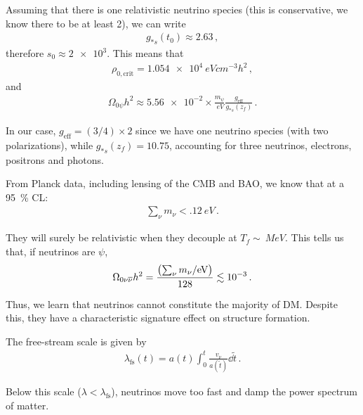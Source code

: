 \documentclass[main.tex]{subfiles}
\begin{document}
Assuming that there is one relativistic neutrino species (this is conservative, we know there to be at least 2), we can write 
%
\begin{align}
g_{*s} (t_0) \approx \num{2.63}
\,,
\end{align}
%
therefore \(s_0  \approx \num{2e3}\). 
This means that 
%
\begin{align}
\rho_{0, \text{crit}} = \SI{1.054e4}{eV cm^{-3}} h^2
\,,
\end{align}
%
and 
%
\begin{align}
\Omega_{0 \psi } h^2 \approx \num{5.56e-2} \times \frac{m_\psi }{\SI{}{eV}} \frac{g _{\text{eff}}}{g_{*s} (z_f)}
\,.
\end{align}

In our case, \(g _{\text{eff}} = (3/4) \times 2\) since we have one neutrino species (with two polarizations), while \(g_{*s}(z_f) = \num{10.75}\), accounting for three neutrinos, electrons, positrons and photons.

From Planck data, including lensing of the CMB and BAO, we know that at a \SI{95}{\percent} CL: 
%
\begin{align}
\sum _{\nu } m_\nu < \SI{.12}{eV}
\,.
\end{align}

They will surely be relativistic when they decouple at \(T_f \sim \SI{}{MeV}\). 
This tells us that, if neutrinos are \(\psi \), 
%
\begin{align}
\Omega_{0 \nu  \overline{\nu}} h^2 = \frac{\qty(\sum _{\nu } m_\nu  / \SI{}{eV})}{128} \lesssim \num{e-3}
\,.
\end{align}

Thus, we learn that neutrinos cannot constitute the majority of DM. 
Despite this, they have a characteristic signature effect on structure formation. 

The free-stream scale is given by 
%
\begin{align}
\lambda_{\text{fs}}(t) = a(t) \int_0^{t} \frac{v_\nu }{a(\widetilde{t})} \dd{\widetilde{t}}
\,.
\end{align}

Below this scale (\(\lambda < \lambda _{\text{fs}}\)), neutrinos move too fast and damp the power spectrum of matter. 
\end{document}
